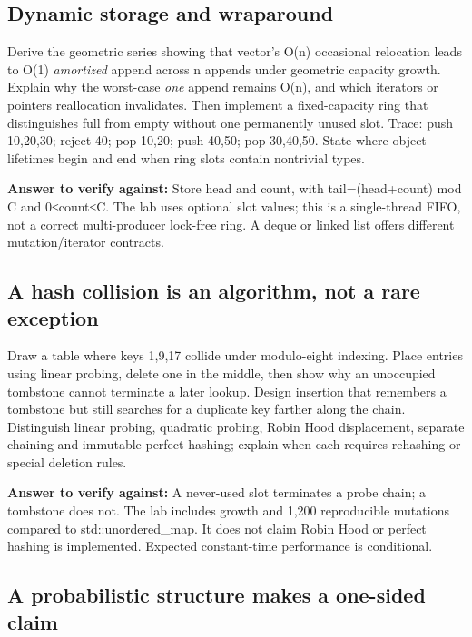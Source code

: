 \subsection{Dynamic storage and wraparound}\label{appendix-8a046b38375e-dynamic-storage-and-wraparound}

Derive the geometric series showing that vector's O(n) occasional relocation leads to O(1) \emph{amortized} append across n appends under geometric capacity growth. Explain why the worst-case \emph{one} append remains O(n), and which iterators or pointers reallocation invalidates. Then implement a fixed-capacity ring that distinguishes full from empty without one permanently unused slot. Trace: push 10,20,30; reject 40; pop 10,20; push 40,50; pop 30,40,50. State where object lifetimes begin and end when ring slots contain nontrivial types.

\textbf{Answer to verify against:} Store head and count, with tail=(head+count) mod C and 0≤count≤C. The lab uses optional slot values; this is a single-thread FIFO, not a correct multi-producer lock-free ring. A deque or linked list offers different mutation/iterator contracts.

\subsection{A hash collision is an algorithm, not a rare exception}\label{appendix-8a046b38375e-a-hash-collision-is-an-algorithm-not-a-rare-exception}

Draw a table where keys 1,9,17 collide under modulo-eight indexing. Place entries using linear probing, delete one in the middle, then show why an unoccupied tombstone cannot terminate a later lookup. Design insertion that remembers a tombstone but still searches for a duplicate key farther along the chain. Distinguish linear probing, quadratic probing, Robin Hood displacement, separate chaining and immutable perfect hashing; explain when each requires rehashing or special deletion rules.

\textbf{Answer to verify against:} A never-used slot terminates a probe chain; a tombstone does not. The lab includes growth and 1,200 reproducible mutations compared to std::unordered\_map. It does not claim Robin Hood or perfect hashing is implemented. Expected constant-time performance is conditional.

\subsection{A probabilistic structure makes a one-sided claim}\label{appendix-8a046b38375e-a-probabilistic-structure-makes-a-one-sided-claim}

